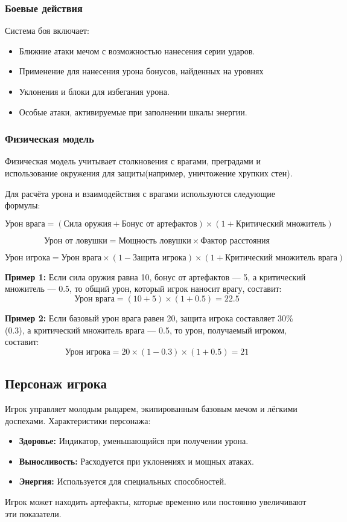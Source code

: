 \documentclass{article}
\begin{document}
\subsubsection{Боевые действия}
Система боя включает:
\begin{itemize}
    \item Ближние атаки мечом с возможностью нанесения серии ударов.
    \item Применение для нанесения урона бонусов, найденных на уровнях
    \item Уклонения и блоки для избегания урона.
    \item Особые атаки, активируемые при заполнении шкалы энергии.
\end{itemize}

\subsubsection{Физическая модель}
Физическая модель учитывает столкновения с врагами, преградами и использование окружения для защиты(например, уничтожение хрупких стен).

Для расчёта урона и взаимодействия с врагами используются следующие формулы:

\[
\textrm{Урон врага} = (\textrm{Сила оружия} + \textrm{Бонус от артефактов}) \times (1 + \textrm{Критический множитель})
\]

\[
\textrm{Урон от ловушки} = \textrm{Мощность ловушки} \times \textrm{Фактор расстояния}
\]

\[
\textrm{Урон игрока} = \textrm{Урон врага} \times (1 - \textrm{Защита игрока}) \times (1 + \textrm{Критический множитель врага})
\]

\textbf{Пример 1:} Если сила оружия равна 10, бонус от артефактов — 5, а критический множитель — 0.5, то общий урон, который игрок наносит врагу, составит:
\[
\textrm{Урон врага} = (10 + 5) \times (1 + 0.5) = 22.5
\]

\textbf{Пример 2:} Если базовый урон врага равен 20, защита игрока составляет 30\% (0.3), а критический множитель врага — 0.5, то урон, получаемый игроком, составит:
\[
\textrm{Урон игрока} = 20 \times (1 - 0.3) \times (1 + 0.5) = 21
\]
\subsection{Персонаж игрока}

Игрок управляет молодым рыцарем, экипированным базовым мечом и лёгкими доспехами. Характеристики персонажа:
\begin{itemize}
    \item \textbf{Здоровье:} Индикатор, уменьшающийся при получении урона.
    \item \textbf{Выносливость:} Расходуется при уклонениях и мощных атаках.
    \item \textbf{Энергия:} Используется для специальных способностей.
\end{itemize}
Игрок может находить артефакты, которые временно или постоянно увеличивают эти показатели.
\end{document}
